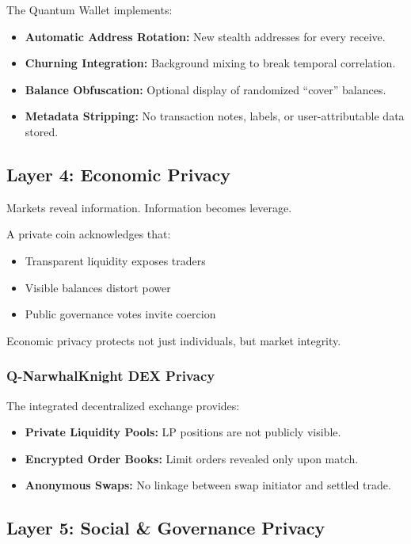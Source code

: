 \documentclass[12pt,a4paper]{article}
\begin{document}
The Quantum Wallet implements:

\begin{itemize}
    \item \textbf{Automatic Address Rotation:} New stealth addresses for every receive.
    \item \textbf{Churning Integration:} Background mixing to break temporal correlation.
    \item \textbf{Balance Obfuscation:} Optional display of randomized ``cover'' balances.
    \item \textbf{Metadata Stripping:} No transaction notes, labels, or user-attributable data stored.
\end{itemize}

\subsection{Layer 4: Economic Privacy}

Markets reveal information. Information becomes leverage.

A private coin acknowledges that:
\begin{itemize}
    \item Transparent liquidity exposes traders
    \item Visible balances distort power
    \item Public governance votes invite coercion
\end{itemize}

Economic privacy protects not just individuals, but market integrity.

\subsubsection{Q-NarwhalKnight DEX Privacy}

The integrated decentralized exchange provides:

\begin{itemize}
    \item \textbf{Private Liquidity Pools:} LP positions are not publicly visible.
    \item \textbf{Encrypted Order Books:} Limit orders revealed only upon match.
    \item \textbf{Anonymous Swaps:} No linkage between swap initiator and settled trade.
\end{itemize}

\subsection{Layer 5: Social \& Governance Privacy}
\end{document}
